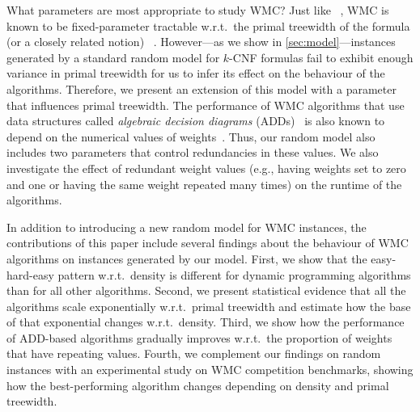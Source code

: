 \documentclass[runningheads]{llncs}
\begin{document}
What parameters are most appropriate to study \textsf{WMC}? Just like
\SAT{}~\cite{DBLP:journals/jair/AtseriasFT11}, \textsf{WMC} is known to be
fixed-parameter tractable w.r.t.\ the primal treewidth of the formula (or a
closely related notion)
~\cite{DBLP:journals/jair/BacchusDP09,DBLP:journals/jacm/Darwiche01,DBLP:conf/ecai/Darwiche04,DBLP:conf/sat/SangBBKP04}.
However---as we show in \cref{sec:model}---instances generated by a standard
random model for $k$-CNF formulas fail to exhibit enough variance in primal
treewidth for us to infer its effect on the behaviour of the algorithms.
Therefore, we present an extension of this model with a parameter that
influences primal treewidth. The performance of \textsf{WMC} algorithms that use
data structures called \emph{algebraic decision diagrams}
(ADDs)~\cite{DBLP:journals/fmsd/BaharFGHMPS97} is also known to depend on the
numerical values of
weights~\cite{DBLP:conf/aaai/DudekPV20,DBLP:conf/cp/DudekPV20}. Thus, our random
model also includes two parameters that control redundancies in these values. We
also investigate the effect of redundant weight values (e.g., having weights set
to zero and one or having the same weight repeated many times) on the runtime of
the algorithms.

In addition to introducing a new random model for \textsf{WMC} instances, the
contributions of this paper include several findings about the behaviour of
\textsf{WMC} algorithms on instances generated by our model. First, we show that
the easy-hard-easy pattern w.r.t.\ density is different for dynamic programming
algorithms than for all other algorithms. Second, we present statistical
evidence that all the algorithms scale exponentially w.r.t.\ primal treewidth
and estimate how the base of that exponential changes w.r.t.\ density. Third, we
show how the performance of ADD-based algorithms gradually improves w.r.t.\ the
proportion of weights that have repeating values. Fourth, we complement our
findings on random instances with an experimental study on \textsf{WMC}
competition benchmarks, showing how the best-performing algorithm changes
depending on density and primal treewidth.
\end{document}
